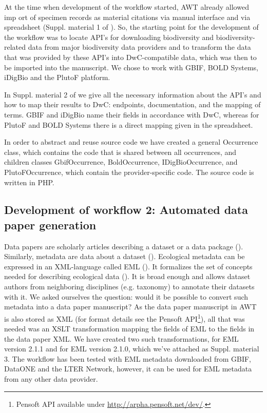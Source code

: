 At the time when development of the workflow started, AWT already allowed imp ort of specimen records as material citations via manual interface and via spreadsheet (Suppl. material 1 of \cite{senderov_online_2016}). So, the starting point for the development of the workflow was to locate API's for downloading biodiversity and biodiversity-related data from major biodiversity data providers and to transform the data that was provided by these API's into DwC-compatible data, which was then to be imported into the manuscript. We chose to work with GBIF, BOLD Systems, iDigBio and the PlutoF platform.

In Suppl. material 2 of \cite{senderov_online_2016} we give all the necessary information about the API's and how to map their results to DwC: endpoints, documentation, and the mapping of terms. GBIF and iDigBio name their fields in accordance with DwC, whereas for PlutoF and BOLD Systems there is a direct mapping given in the spreadsheet.

In order to abstract and reuse source code we have created a general Occurrence class, which contains the code that is shared between all occurrences, and children classes GbifOccurrence, BoldOccurrence, IDigBioOccurrence, and PlutoFOccurrence, which contain the provider-specific code. The source code is written in PHP.

\subsection{Development of workflow 2: Automated data paper generation}

Data papers are scholarly articles describing a dataset or a data package (\cite{chavan_data_2011}). Similarly, metadata are data about a dataset (\cite{michener_meta-information_2006}). Ecological metadata can be expressed in an XML-language called EML (\cite{fegraus_maximizing_2005}). It formalizes the set of concepts needed for describing ecological data (\cite{fegraus_maximizing_2005}). It is broad enough and allows dataset authors from neighboring disciplines (e.g. taxonomy) to annotate their datasets with it. We asked ourselves the question: would it be possible to convert such metadata into a data paper manuscript? As the data paper manuscript in AWT is also stored as XML (for format details see the Pensoft API\footnote{Pensoft API available under \url{http://arpha.pensoft.net/dev/}.}), all that was needed was an XSLT transformation mapping the fields of EML to the fields in the data paper XML. We have created two such transformations, for EML version 2.1.1 and for EML version 2.1.0, which we've attached as Suppl. material 3. The workflow has been tested with EML metadata downloaded from GBIF, DataONE and the LTER Network, however, it can be used for EML metadata from any other data provider.

